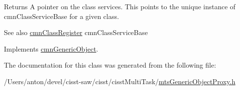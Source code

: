\begin{DoxyReturn}{Returns}
A pointer on the class services. This points to the unique instance of cmn\+Class\+Service\+Base for a given class.
\end{DoxyReturn}
\begin{DoxySeeAlso}{See also}
\hyperlink{classcmn_class_register}{cmn\+Class\+Register} cmn\+Class\+Service\+Base 
\end{DoxySeeAlso}


Implements \hyperlink{classcmn_generic_object_ac1e9145a0ed0711ac0c0c3edd37b673a}{cmn\+Generic\+Object}.



The documentation for this class was generated from the following file\+:\begin{DoxyCompactItemize}
\item 
/\+Users/anton/devel/cisst-\/saw/cisst/cisst\+Multi\+Task/\hyperlink{mts_generic_object_proxy_8h}{mts\+Generic\+Object\+Proxy.\+h}\end{DoxyCompactItemize}
